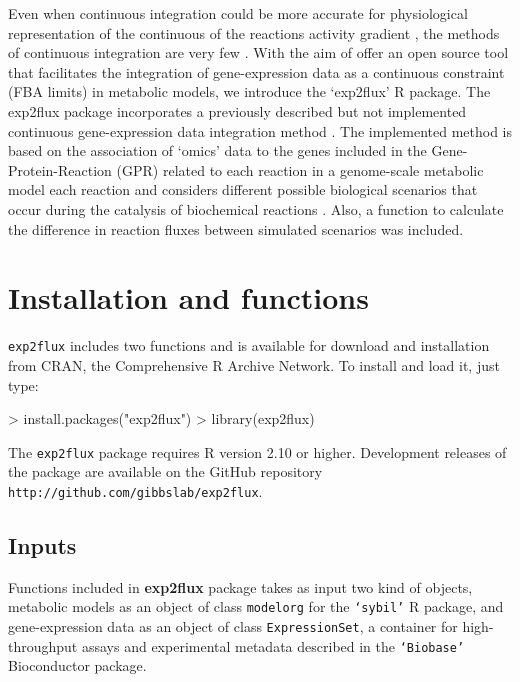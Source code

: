 Even when continuous integration could be more accurate for physiological representation of the continuous of the reactions activity gradient \cite{topfer2013integration}, the methods of continuous integration are very few \cite{machado2014systematic}. With the aim of offer an open source tool that facilitates the integration of gene-expression data as a continuous constraint (FBA limits) in metabolic models, we introduce the ‘exp2flux’ R package. The exp2flux package incorporates a previously described but not implemented continuous gene-expression data integration method \cite{colijn2009interpreting,Carbonell2016}. The implemented method is based on the association of `omics' data to the genes included in the Gene-Protein-Reaction (GPR) related to each reaction in a genome-scale metabolic model  each reaction \cite{Thiele2010} and considers different possible biological scenarios that occur during the catalysis of biochemical reactions \cite{colijn2009interpreting}. Also, a function to calculate the difference in reaction fluxes between simulated scenarios was included.

\section{Installation and functions}
\texttt{exp2flux} includes two functions and is available for download and installation from CRAN, the
Comprehensive R Archive Network. To install and load it, just type:
\begin{Schunk}
\begin{Sinput}
> install.packages("exp2flux")
> library(exp2flux)
\end{Sinput}
\end{Schunk}
The \texttt{exp2flux} package requires R version 2.10 or higher. Development releases of the package are available on the GitHub repository \texttt{http://github.com/gibbslab/exp2flux}.
\subsection*{Inputs}
Functions included in \textbf{exp2flux} package takes as input two kind of objects, metabolic models as an object of class \texttt{modelorg} for the \texttt{`sybil'} R package, and gene-expression data as an object of class \texttt{ExpressionSet}, a container for high-throughput assays and experimental metadata described in the \texttt{`Biobase'} Bioconductor package. 
